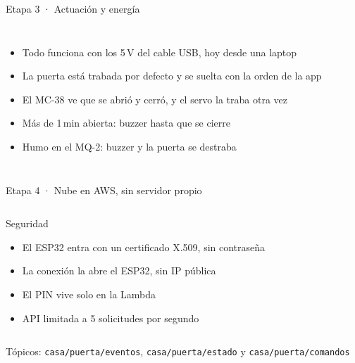 \documentclass[aspectratio=169,10pt]{beamer}
\begin{document}
\begin{frame}{Etapa 3 · Actuación y energía}
  \begin{columns}[c]
    \centering
    \resizebox{\linewidth}{!}{}
    \small
    \begin{itemize}
      \item Todo funciona con los 5\,V del cable USB, hoy desde una laptop
      \item La puerta está trabada por defecto y se suelta con la orden de la app
      \item El MC-38 ve que se abrió y cerró, y el servo la traba otra vez
      \item Más de 1\,min abierta: buzzer hasta que se cierre
      \item Humo en el MQ-2: buzzer y la puerta se destraba
    \end{itemize}
  \end{columns}
\end{frame}

\begin{frame}{Etapa 4 · Nube en AWS, sin servidor propio}
  \begin{columns}[c]
    \centering
    \begin{block}{Seguridad}
      \small
      \begin{itemize}
        \item El ESP32 entra con un certificado X.509, sin contraseña
        \item La conexión la abre el ESP32, sin IP pública
        \item El PIN vive solo en la Lambda
        \item API limitada a 5 solicitudes por segundo
      \end{itemize}
    \end{block}
  \end{columns}
  \vspace{3mm}
  {\small Tópicos: \texttt{casa/puerta/eventos}, \texttt{casa/puerta/estado} y \texttt{casa/puerta/comandos}}
\end{frame}
\end{document}
